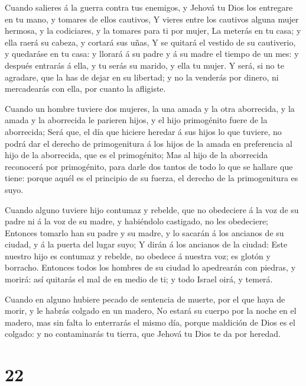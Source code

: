  Cuando salieres á la guerra contra tus enemigos, y Jehová
tu Dios los entregare en tu mano, y tomares de ellos cautivos,
 Y vieres entre los cautivos alguna mujer hermosa, y la
codiciares, y la tomares para ti por mujer,  La meterás en
tu casa; y ella raerá su cabeza, y cortará sus uñas,  Y se
quitará el vestido de su cautiverio, y quedaráse en tu casa: y llorará á
su padre y á su madre el tiempo de un mes: y después entrarás á ella, y
tu serás su marido, y ella tu mujer.  Y será, si no te
agradare, que la has de dejar en su libertad; y no la venderás por
dinero, ni mercadearás con ella, por cuanto la afligiste.

 Cuando un hombre tuviere dos mujeres, la una amada y la
otra aborrecida, y la amada y la aborrecida le parieren hijos, y el hijo
primogénito fuere de la aborrecida;  Será que, el día que
hiciere heredar á sus hijos lo que tuviere, no podrá dar el derecho de
primogenitura á los hijos de la amada en preferencia al hijo de la
aborrecida, que es el primogénito;  Mas al hijo de la
aborrecida reconocerá por primogénito, para darle dos tantos de todo lo
que se hallare que tiene: porque aquél es el principio de su fuerza, el
derecho de la primogenitura es suyo.

 Cuando alguno tuviere hijo contumaz y rebelde, que no
obedeciere á la voz de su padre ni á la voz de su madre, y habiéndolo
castigado, no les obedeciere;  Entonces tomarlo han su
padre y su madre, y lo sacarán á los ancianos de su ciudad, y á la
puerta del lugar suyo;  Y dirán á los ancianos de la
ciudad: Este nuestro hijo es contumaz y rebelde, no obedece á nuestra
voz; es glotón y borracho.  Entonces todos los hombres de
su ciudad lo apedrearán con piedras, y morirá: así quitarás el mal de en
medio de ti; y todo Israel oirá, y temerá.

 Cuando en alguno hubiere pecado de sentencia de muerte,
por el que haya de morir, y le habrás colgado en un madero,
 No estará su cuerpo por la noche en el madero, mas sin
falta lo enterrarás el mismo día, porque maldición de Dios es el
colgado: y no contaminarás tu tierra, que Jehová tu Dios te da por
heredad.

\hypertarget{section-21}{%
\section{22}\label{section-21}}

